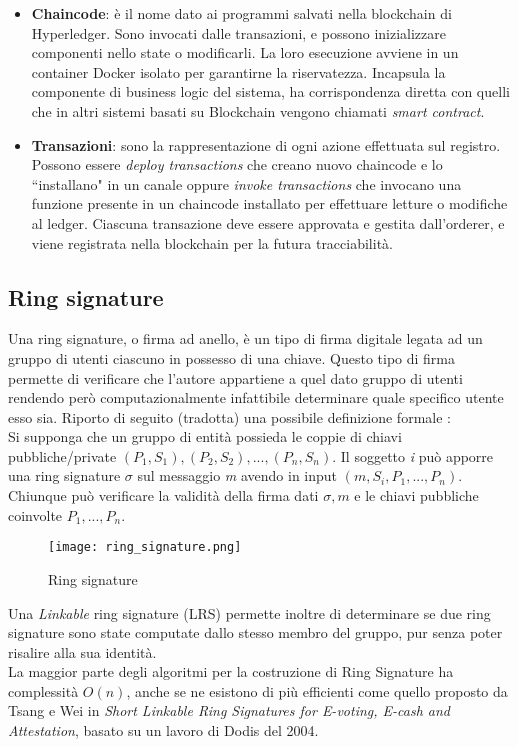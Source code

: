 \begin{itemize}
				\item \textbf{Chaincode}: è il nome dato ai programmi salvati nella blockchain di Hyperledger. Sono invocati dalle transazioni, e possono inizializzare componenti nello state o modificarli. La loro esecuzione avviene in un container Docker isolato per garantirne la riservatezza. Incapsula la componente di business logic del sistema, ha corrispondenza diretta con quelli che in altri sistemi basati su Blockchain vengono chiamati \emph{smart contract}.
				\item \textbf{Transazioni}: sono la rappresentazione di ogni azione effettuata sul registro. Possono essere \emph{deploy transactions} che creano nuovo chaincode e lo ``installano" in un canale oppure \emph{invoke transactions} che invocano una funzione presente in un chaincode installato per effettuare letture o modifiche al ledger. Ciascuna transazione deve essere approvata e gestita dall'orderer, e viene registrata nella blockchain per la futura tracciabilità.
			\end{itemize}
		
	\subsection{Ring signature}
		Una ring signature, o firma ad anello, è un tipo di firma digitale legata ad un gruppo di utenti ciascuno in possesso di una chiave. Questo tipo di firma permette di verificare che l'autore appartiene a quel dato gruppo di utenti rendendo però computazionalmente infattibile determinare quale specifico utente esso sia. Riporto di seguito (tradotta) una possibile definizione formale \cite{ring_signature}: \\
		Si supponga che un gruppo di entità possieda le coppie di chiavi pubbliche/private $(P_1, S_1), (P_2, S_2), ..., (P_n, S_n)$. Il soggetto \emph{i} può apporre una ring signature $\sigma$ sul messaggio \emph{m} avendo in input $(m, S_i, P_1, ..., P_n)$. Chiunque può verificare la validità della firma dati $\sigma, m$ e le chiavi pubbliche coinvolte $P_1, ..., P_n$.
		\begin{figure}[ht]
			\centering
			\texttt{[image: ring\_signature.png]}
			\caption{Ring signature}
			\label{fig:ring_signature}
		\end{figure}
		Una \emph{Linkable} ring signature (LRS) permette inoltre di determinare se due ring signature sono state computate dallo stesso membro del gruppo, pur senza poter risalire alla sua identità. \\
		La maggior parte degli algoritmi per la costruzione di Ring Signature ha complessità $O(n)$, anche se ne esistono di più efficienti come quello proposto da Tsang e Wei in \emph{Short Linkable Ring Signatures for E-voting, E-cash and Attestation}\cite{SLRS}, basato su un lavoro di Dodis del 2004.

